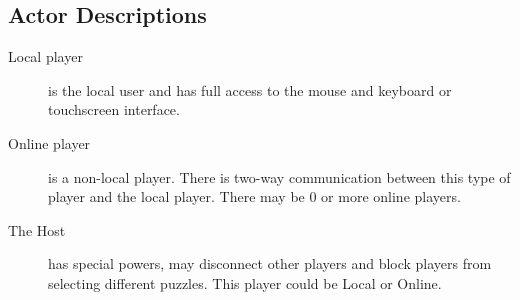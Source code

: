 \documentclass[12pt]{article}
\begin{document}
\subsection{Actor Descriptions}
    \begin{description}
        \item[Local player] is the local user and has full
            access to the mouse and keyboard or touchscreen interface.
        \item[Online player] is a non-local player. There is two-way
            communication between this type of player and the local player.
            There may be 0 or more online players.
        \item[The Host] has special powers, may disconnect other players and
            block players from selecting different puzzles. This player could
            be Local or Online.
    \end{description}
\end{document}
